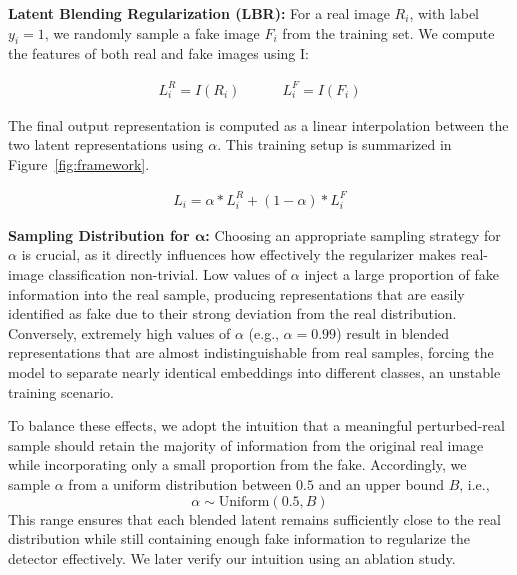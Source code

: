 \noindent\textbf{Latent Blending Regularization (LBR): }For a real image $R_i$, with label $y_i=1$, we randomly sample a fake image $F_i$ from the training set. We compute the features of both real and fake images using I:
\relax\vspace{-15pt}
\begin{center}
    \begin{align}
    L_i^{R} = I(R_i) \qquad \quad
    L_i^{F} = I(F_i)
\label{eqn:lbr_1}
\end{align}
\end{center}
The final output representation is computed as a linear interpolation between the two latent representations using $\alpha$. This training setup is summarized in Figure~\ref{fig:framework}.
\relax\vspace{-20pt}
\begin{center}
    \begin{align}
    L_i = \alpha * L_i^{R} + (1-\alpha) * L_i^{F}
\label{eqn:lbr_2}
\end{align}
\end{center}

\noindent\textbf{Sampling Distribution for $\bm{\alpha}$:}  
Choosing an appropriate sampling strategy for $\alpha$ is crucial, as it directly influences how effectively the regularizer makes real-image classification non-trivial. Low values of $\alpha$ inject a large proportion of fake information into the real sample, producing representations that are easily identified as fake due to their strong deviation from the real distribution. Conversely, extremely high values of $\alpha$ (e.g., $\alpha = 0.99$) result in blended representations that are almost indistinguishable from real samples, forcing the model to separate nearly identical embeddings into different classes, an unstable training scenario.  

To balance these effects, we adopt the intuition that a meaningful perturbed-real sample should retain the majority of information from the original real image while incorporating only a small proportion from the fake. Accordingly, we sample $\alpha$ from a uniform distribution between $0.5$ and an upper bound $B$, i.e.,
\begin{equation}
\alpha \sim \text{Uniform}(0.5, B)
\label{eqn:alpha_sampling}
\end{equation}
This range ensures that each blended latent remains sufficiently close to the real distribution while still containing enough fake information to regularize the detector effectively. We later verify our intuition using an ablation study.

